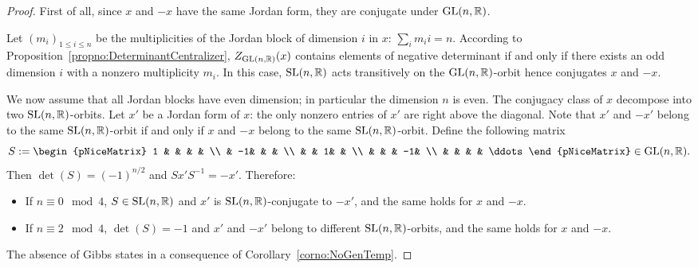 \documentclass[english]{article}
\begin{document}
\begin{proof}
    First of all, since $x$ and $-x$ have the same Jordan form, they are conjugate under $\operatorname{GL}(n, \mathbb{R})$.
    

    Let $(m_i)_{1\leqslant i \leqslant n}$ be the multiplicities of the Jordan block of dimension $i$ in $x$: $\sum_{i} m_i i = n$. According to Proposition~\ref{propno:DeterminantCentralizer}, $Z_{\operatorname{GL}(n, \mathbb{R})}(x)$ contains elements of negative determinant if and only if there exists an odd dimension $i$ with a nonzero multiplicity $m_i$. In this case, $\operatorname{SL}(n, \mathbb{R})$ acts transitively on the $\operatorname{GL}(n, \mathbb{R})$-orbit hence conjugates $x$ and $-x$.

    We now assume that all Jordan blocks have even dimension; in particular the dimension $n$ is even. The conjugacy class of $x$ decompose into two $\operatorname{SL}(n, \mathbb{R})$-orbits. 
    Let $x'$ be a Jordan form of $x$: the only nonzero entries of $x'$ are right above the diagonal. Note that $x'$ and $-x'$ belong to the same $\operatorname{SL}(n, \mathbb{R})$-orbit if and only if $x$ and $-x$ belong to the same $\operatorname{SL}(n, \mathbb{R})$-orbit. Define the following matrix
    \[
        S:= \begin{pNiceMatrix}
                1 & & & & \\
                 & -1& & & \\
                 & & 1& & \\
                 & & & -1& \\
                 & & & & \ddots
        \end{pNiceMatrix}
        \in \GL(n, \setR)
    .\]
    Then $\det(S) = (-1)^{n/2}$ and $Sx'S^{-1} = -x'$. 
    Therefore:
    \begin{itemize}
        \item If $n \equiv 0 \mod 4$, $S\in \operatorname{SL}(n, \mathbb{R})$ and $x'$ is $\operatorname{SL}(n, \mathbb{R})$-conjugate to $-x'$, and the same holds for $x$ and $-x$.
        \item If $n \equiv 2 \mod 4$, $\det(S)=-1$ and $x'$ and $-x'$ belong to different $\operatorname{SL}(n, \mathbb{R})$-orbits, and the same holds for $x$ and $-x$.
    \end{itemize}

    The absence of Gibbs states in a consequence of Corollary~\ref{corno:NoGenTemp}.
\end{proof}
\end{document}
